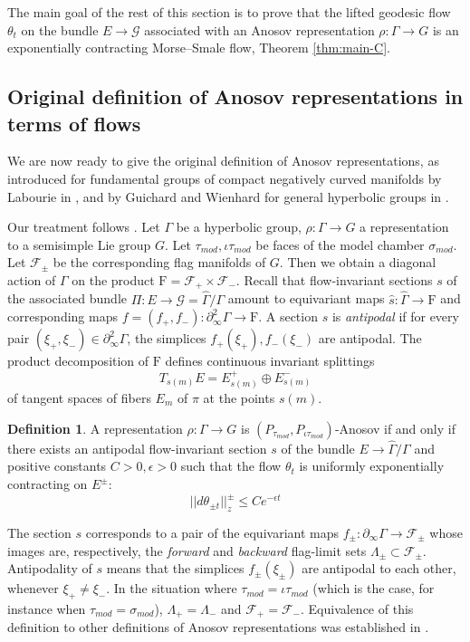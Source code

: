 \documentclass[12pt]{amsbook}%
\theoremstyle{definition}
\newtheorem{defi}[thm]{Definition}
\theoremstyle{remark}
\numberwithin{section}{chapter}
\numberwithin{subsection}{section}
\numberwithin{figure}{chapter}
\def\eps{\epsilon}
\def\taumod{\tau_{mod}}
\def\simod{\sigma_{mod}}
\def\cF{{\mathscr{F}}}
\def\F{\mathrm{F}}
\def\Ga{\Gamma}
\def\La{\Lambda}
\def\geo{\partial_\infty}
\def\cG{{\mathscr{G}}}
\begin{document}
{{The main goal of the rest of this section is to prove that the lifted geodesic flow $\theta_t$ on the bundle $E\to \cG$ associated with an Anosov representation 
$\rho: \Ga\to G$ is an exponentially contracting Morse--Smale flow, Theorem \ref{thm:main-C}. 

\subsection{Original definition of Anosov representations in terms of flows}

We are now ready to give the original definition of Anosov representations, as introduced for  fundamental groups of compact negatively curved manifolds by Labourie in \cite{Labourie}, and by Guichard and Wienhard for general hyperbolic groups in \cite{Guichard-Wienhard}. 

Our treatment follows  \cite[Appendix]{KLP17}. 
Let $\Ga$ be a hyperbolic group, $\rho: \Ga\to G$ a representation to a semisimple Lie group $G$. Let $\taumod, \iota\taumod$ be faces of the model chamber $\simod$. Let $\cF_\pm$ be the corresponding flag manifolds of $G$. 
Then we obtain a diagonal action of $\Ga$ on the product $\F= \cF_+\times \cF_-$. Recall  
that flow-invariant sections $s$ of the associated bundle 
$\Pi: E\to \cG=\widehat\Ga/\Ga$ amount to equivariant maps $\hat s: \widehat\Ga\to \F$ and corresponding 
maps $f=(f_+,f_-): \geo^2 \Ga\to \F$. 
A section $s$ is {\em antipodal} if for every pair $(\xi_+,\xi_-)\in \geo^2 \Ga$, the simplices 
$f_+(\xi_+), f_-(\xi_-)$ are antipodal. 
The product decomposition of $\F$ defines continuous invariant splittings 
$$
T_{s(m)} E=E^+_{s(m)}\oplus E^-_{s(m)}$$ 
of tangent spaces of fibers $E_{m}$ of $\pi$ at the points $s(m)$. 


\begin{defi}\label{defn:original Anosov} 
A representation $\rho: \Ga\to G$ is $(P_{\taumod}, P_{\iota\taumod})$-Anosov if and only if 
there exists an antipodal flow-invariant section $s$ of the bundle $E\to \widehat\Ga/\Ga$ and positive constants $C>0, \eps>0$ 
such that the flow $\theta_{t}$ is 
 uniformly exponentially contracting on $E^\pm$:
 $$
||d\theta_{\pm t}||_z^\pm \leqslant C e^{-\eps t} 
$$ 
\end{defi}

The section $s$ corresponds to a pair of the equivariant maps $f_\pm: \geo \Ga\to \cF_\pm$ whose images are, respectively, the {\em forward} and {\em backward} flag-limit sets $\La_\pm\subset \cF_\pm$. Antipodality of $s$ means that the simplices $f_\pm(\xi_\pm)$ are antipodal to each other, whenever 
$\xi_+\ne \xi_-$. In the situation where $\taumod=\iota\taumod$ 
(which is the case, for instance when $\taumod=\simod$), $\La_+=\La_-$ and $\cF_+=\cF_-$. Equivalence of this definition to other definitions of Anosov representations was established in \cite{KLP17}. 



}}
\end{document}
